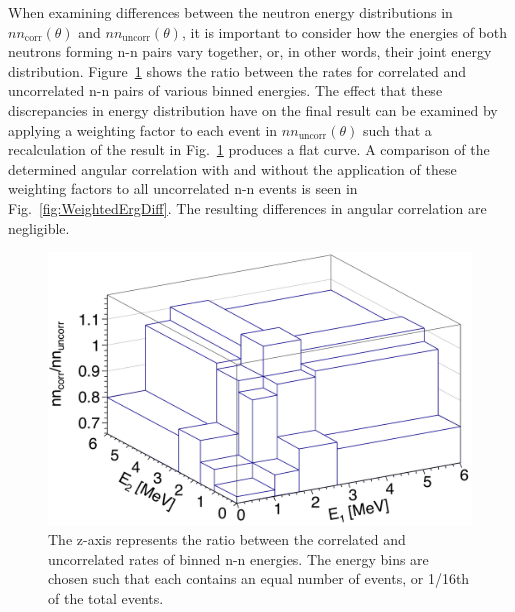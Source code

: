 When examining differences between the neutron energy distributions in $nn_{\text{corr}}(\theta)$ and $nn_{\text{uncorr}}(\theta)$, it is important to consider how the energies of both neutrons forming n-n pairs vary together, or, in other words, their joint energy distribution.
Figure~\ref{fig:ErgDiffLego} shows the ratio between the rates for correlated and uncorrelated n-n pairs of various binned energies.
The effect that these discrepancies in energy distribution have on the final result can be examined by applying a weighting factor to each event in $nn_{\text{uncorr}}(\theta)$ such that a recalculation of the result in Fig.~\ref{fig:ErgDiffLego} produces a flat curve.
A comparison of the determined angular correlation with and without the application of these weighting factors to all uncorrelated n-n events is seen in Fig.~\ref{fig:WeightedErgDiff}.
The resulting differences in angular correlation are negligible.
\begin{figure}[]
\centering
    \includegraphics[width=\figsize\textwidth]{ErgDiffLego.png}
    \caption{
    The z-axis represents the ratio between the correlated and uncorrelated rates of binned n-n energies.
    The energy bins are chosen such that each contains an equal number of events, or 1/16th of the total events.
    }
    \label{fig:ErgDiffLego}
\end{figure}
